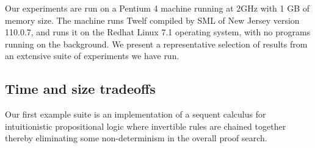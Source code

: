 \documentclass{llncs}
\begin{document}
Our experiments are run on a Pentium 4 machine running at 2GHz with 1
GB of memory size.  The machine runs Twelf compiled by SML of New
Jersey version 110.0.7, and runs it on the Redhat Linux 7.1 operating
system, with no programs running on the background. We present a
representative selection of results from an extensive suite of
experiments we have run.
   

\subsection{Time and size tradeoffs}

Our first example suite is an implementation of a sequent calculus for
intuitionistic propositional logic where invertible rules are chained
together thereby eliminating some non-determinism in the overall proof
search.
\end{document}
